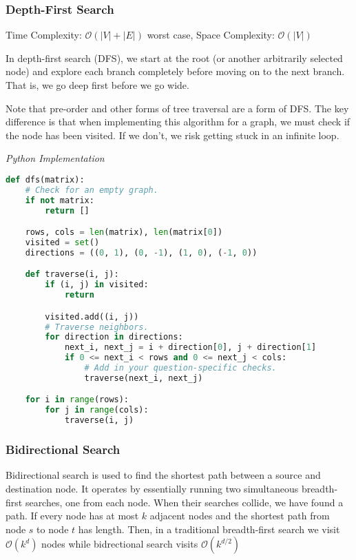 \documentclass{article}
\newcommand{\bigO}{\ensuremath{\mathcal{O}}}
\begin{document}
    \subsubsection{Depth-First Search }
    Time Complexity: $\bigO(|V| + |E|)$ worst case, Space Complexity: $\bigO(|V|)$
    
    In depth-first search (DFS), we start at the root (or another arbitrarily selected node) and explore each branch completely before moving on to the next branch. That is, we go deep first before we go wide. 
    
    Note that pre-order and other forms of tree traversal are a form of DFS. The key difference is that when implementing this algorithm for a graph, we must check if the node has been visited. If we don't, we risk getting stuck in an infinite loop. 
    
\vspace{8pt} \emph{Python Implementation}
\begin{lstlisting}[language=Python]
def dfs(matrix):
    # Check for an empty graph.
    if not matrix:
        return []

    rows, cols = len(matrix), len(matrix[0])
    visited = set()
    directions = ((0, 1), (0, -1), (1, 0), (-1, 0))

    def traverse(i, j):
        if (i, j) in visited:
            return

        visited.add((i, j))
        # Traverse neighbors.
        for direction in directions:
            next_i, next_j = i + direction[0], j + direction[1]
            if 0 <= next_i < rows and 0 <= next_j < cols:
                # Add in your question-specific checks.
                traverse(next_i, next_j)

    for i in range(rows):
        for j in range(cols):
            traverse(i, j)

\end{lstlisting}

    \subsubsection{Bidirectional Search}
    Bidirectional search is used to find the shortest path between a source and destination node. It operates by essentially running two simultaneous breadth-first searches, one from each node. When their searches collide, we have found a path.  If every node has at most $k$ adjacent nodes and the shortest path from node $s$ to node $t$ has length. Then, in a traditional breadth-first search we visit $\mathcal{O}(k^d)$ nodes while bidrectional search visits $\mathcal{O}(k^{d/2})$
\end{document}
